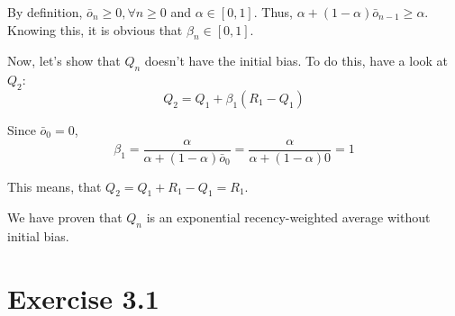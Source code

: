 \documentclass[12pt, a4paper]{article}
\begin{document}
        By definition, $\bar{o}_n \geq 0, \forall n \geq 0$ and $\alpha \in [0, 1]$. Thus, $\alpha + (1 - \alpha) \bar{o}_{n-1} \geq \alpha$.
        Knowing this, it is obvious that $\beta_n \in [0, 1]$.

        Now, let's show that $Q_n$ doesn't have the initial bias. To do this, have a look at $Q_2$:
        $$Q_2 = Q_1 + \beta_1 (R_1 - Q_1)$$

        Since $\bar{o}_0 = 0$,
        $$\beta_1 = \frac{\alpha}{\alpha + (1 - \alpha) \bar{o}_{0}} = \frac{\alpha}{\alpha + (1 - \alpha) 0} = 1$$

        This means, that $Q_2 = Q_1 + R_1 - Q_1 = R_1$.

        We have proven that $Q_n$ is an exponential recency-weighted average without initial bias.

    \section{Exercise 3.1}
\end{document}
